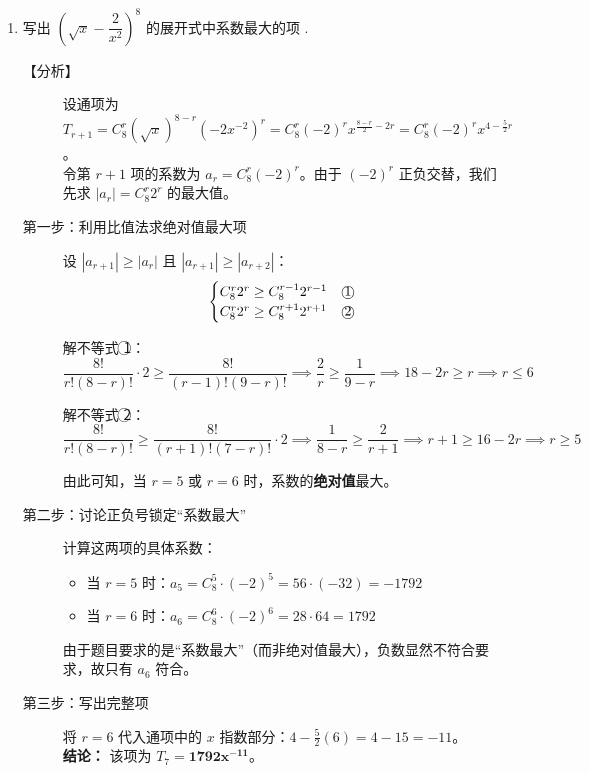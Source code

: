 \documentclass[11pt,a4paper]{article}
\begin{document}
\newpage

\begin{enumerate}[label=\arabic*., start=13, leftmargin=1.5em]

    \item 写出 $\left( \sqrt{x} - \dfrac{2}{x^2} \right)^8$ 的展开式中系数最大的项 \underline{\hspace{2cm}}. 
    
    \begin{description}
        \item[【分析】] 
        设通项为 $T_{r+1} = C_8^r (\sqrt{x})^{8-r} \left( -2x^{-2} \right)^r = C_8^r (-2)^r x^{\frac{8-r}{2} - 2r} = C_8^r (-2)^r x^{4 - \frac{5}{2}r}$。\\
        令第 $r+1$ 项的系数为 $a_r = C_8^r (-2)^r$。由于 $(-2)^r$ 正负交替，我们先求 $|a_r| = C_8^r 2^r$ 的最大值。
        
        \item[第一步：利用比值法求绝对值最大项]
        设 $|a_{r+1}| \geq |a_r|$ 且 $|a_{r+1}| \geq |a_{r+2}|$：
        \[ \begin{cases} C_8^r 2^r \geq C_8^{r-1} 2^{r-1} & \text{\textcircled{1}} \\ C_8^r 2^r \geq C_8^{r+1} 2^{r+1} & \text{\textcircled{2}} \end{cases} \]
        
        解不等式 \textcircled{1}：
        \[ \frac{8!}{r!(8-r)!} \cdot 2 \geq \frac{8!}{(r-1)!(9-r)!} \implies \frac{2}{r} \geq \frac{1}{9-r} \implies 18-2r \geq r \implies r \leq 6 \]
        
        解不等式 \textcircled{2}：
        \[ \frac{8!}{r!(8-r)!} \geq \frac{8!}{(r+1)!(7-r)!} \cdot 2 \implies \frac{1}{8-r} \geq \frac{2}{r+1} \implies r+1 \geq 16-2r \implies r \geq 5 \]
        
        由此可知，当 $r=5$ 或 $r=6$ 时，系数的\textbf{绝对值}最大。
        
        \item[第二步：讨论正负号锁定“系数最大”]
        计算这两项的具体系数：
        \begin{itemize}
            \item 当 $r=5$ 时：$a_5 = C_8^5 \cdot (-2)^5 = 56 \cdot (-32) = -1792$
            \item 当 $r=6$ 时：$a_6 = C_8^6 \cdot (-2)^6 = 28 \cdot 64 = 1792$
        \end{itemize}
        
        由于题目要求的是“系数最大”（而非绝对值最大），负数显然不符合要求，故只有 $a_6$ 符合。
        
        \item[第三步：写出完整项]
        将 $r=6$ 代入通项中的 $x$ 指数部分：$4 - \frac{5}{2}(6) = 4 - 15 = -11$。\\
        \textbf{结论：} 该项为 $T_7 = \mathbf{1792x^{-11}}$。
    \end{description}
\end{enumerate}
\end{document}
